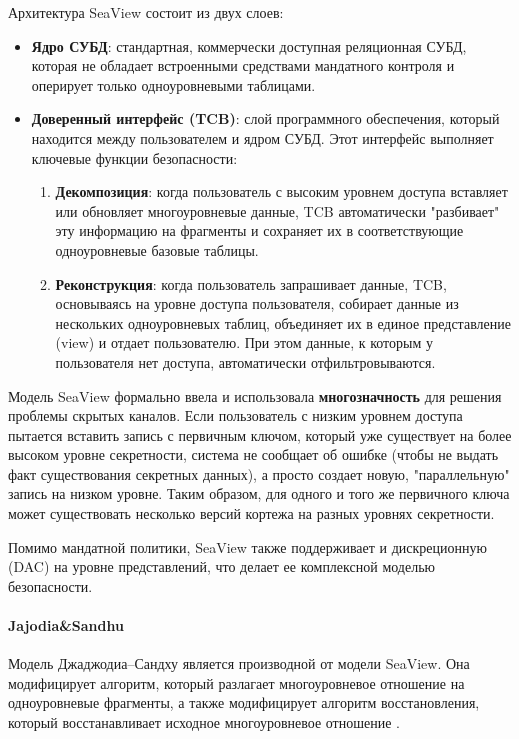 Архитектура SeaView состоит из двух слоев:
\begin{itemize}
    \item \textbf{Ядро СУБД}: стандартная, коммерчески доступная реляционная СУБД, которая не обладает встроенными средствами мандатного контроля и оперирует только одноуровневыми таблицами.
    \item \textbf{Доверенный интерфейс (TCB)}: слой программного обеспечения, который находится между пользователем и ядром СУБД. Этот интерфейс выполняет ключевые функции безопасности:
    \begin{enumerate}
        \item \textbf{Декомпозиция}: когда пользователь с высоким уровнем доступа вставляет или обновляет многоуровневые данные, TCB автоматически "разбивает" эту информацию на фрагменты и сохраняет их в соответствующие одноуровневые базовые таблицы.
        \item \textbf{Реконструкция}: когда пользователь запрашивает данные, TCB, основываясь на уровне доступа пользователя, собирает данные из нескольких одноуровневых таблиц, объединяет их в единое представление (view) и отдает пользователю. При этом данные, к которым у пользователя нет доступа, автоматически отфильтровываются.
    \end{enumerate}
\end{itemize}

Модель SeaView формально ввела и использовала \textbf{многозначность} для решения проблемы скрытых каналов. Если пользователь с низким уровнем доступа пытается вставить запись с первичным ключом, который уже существует на более высоком уровне секретности, система не сообщает об ошибке (чтобы не выдать факт существования секретных данных), а просто создает новую, "параллельную" запись на низком уровне. Таким образом, для одного и того же первичного ключа может существовать несколько версий кортежа на разных уровнях секретности.

Помимо мандатной политики, SeaView также поддерживает и дискреционную (DAC) на уровне представлений, что делает ее комплексной моделью безопасности.

\paragraph{Jajodia\&Sandhu}

Модель Джаджодиа–Сандху является производной от модели SeaView. Она модифицирует алгоритм, который разлагает
многоуровневое отношение на одноуровневые фрагменты, а также модифицирует алгоритм восстановления, который
восстанавливает исходное многоуровневое отношение \autocite{Osama}.

